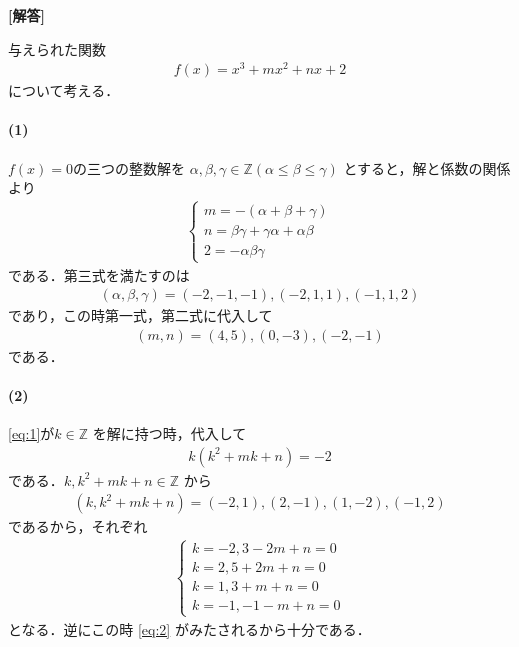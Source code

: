 \documentclass[../../main.tex]{subfiles}
\begin{document}
\begin{oframed}
  
\end{oframed}

{\bf [解答]}

与えられた関数
\begin{align}
  f(x) = x^3 + mx^2 + nx + 2 \label{eq:1}
\end{align}
について考える．

\paragraph{(1)}

$f(x)=0$の三つの整数解を $\alpha, \beta, \gamma \in \mathbb{Z} (\alpha \le \beta \le \gamma)$ とすると，解と係数の関係より
\begin{align}
  \begin{cases}
    m = -(\alpha + \beta + \gamma) \\
    n = \beta\gamma + \gamma\alpha + \alpha\beta \\
    2 = -\alpha\beta\gamma
  \end{cases}
\end{align}
である．第三式を満たすのは
\begin{align}
  (\alpha, \beta, \gamma) = (-2, -1, -1), (-2, 1, 1), (-1, 1, 2)
\end{align}
であり，この時第一式，第二式に代入して
\begin{align}
  (m, n) = (4, 5), (0, -3), (-2, -1)
\end{align}
である．

\paragraph{(2)}

\cref{eq:1}が$k \in \mathbb{Z}$ を解に持つ時，代入して
\begin{align}
  k(k^2 + mk + n) = -2 \label{eq:2}
\end{align}
である．$k, k^2 + mk + n \in \mathbb{Z}$ から
\begin{align}
  (k, k^2 + mk + n) = (-2, 1), (2, -1), (1, -2), (-1, 2) \label{eq:3}
\end{align}
であるから，それぞれ
\begin{align}
  \begin{cases}
    k = -2, 3 - 2m + n = 0 \\
    k = 2, 5 + 2m + n = 0 \\
    k = 1, 3 + m + n = 0 \\
    k = -1, -1 - m + n = 0
  \end{cases} \label{eq:4}
\end{align}
となる．逆にこの時 \cref{eq:2} がみたされるから十分である．
\end{document}
